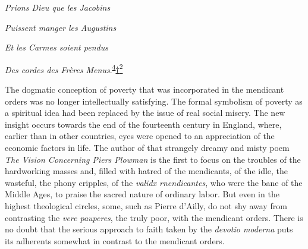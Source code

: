 \emph{Prions Dieu que les Jacobins}

\emph{Puissent manger les Augustins}

\emph{Et les Carmes soient pendus}

\emph{Des cordes des Frères
Menus}.\textsuperscript{\protect\hypertarget{14_Chapter_Seven__THE_PIOUS_PERSONA.xhtmlux5cux23id_1015}{\protect\hyperlink{23_NOTES.xhtmlux5cux23id_1016}{4}}}\protect\hypertarget{14_Chapter_Seven__THE_PIOUS_PERSONA.xhtmlux5cux23id_3079}{\protect\hyperlink{23_NOTES.xhtmlux5cux23id_3080}{†\textsuperscript{2}}}

\protect\hypertarget{14_Chapter_Seven__THE_PIOUS_PERSONA.xhtmlux5cux23page_205}{}{}The
dogmatic conception of poverty that was incorporated in the mendicant
orders was no longer intellectually satisfying. The formal symbolism of
poverty as a spiritual idea had been replaced by the issue of real
social misery. The new insight occurs towards the end of the fourteenth
century in England, where, earlier than in other countries, eyes were
opened to an appreciation of the economic factors in life. The author of
that strangely dreamy and misty poem \emph{The Vision Concerning Piers
Plowman} is the first to focus on the troubles of the hardworking masses
and, filled with hatred of the mendicants, of the idle, the wasteful,
the phony cripples, of the \emph{validx rnendicantes}, who were the bane
of the Middle Ages, to praise the sacred nature of ordinary labor. But
even in the highest theological circles, some, such as Pierre d'Ailly,
do not shy away from contrasting the \emph{vere pauperes}, the truly
poor, with the mendicant orders. There is no doubt that the serious
approach to faith taken by the \emph{devotio moderna} puts its adherents
somewhat in contrast to the mendicant orders.

